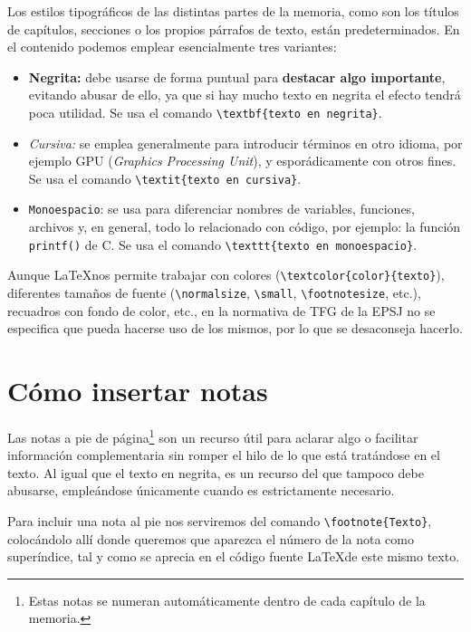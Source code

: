 Los estilos tipográficos de las distintas partes de la memoria, como son los títulos de capítulos, secciones o los propios párrafos de texto, están predeterminados. En el contenido podemos emplear esencialmente tres variantes:

\begin{itemize}
    \item \textbf{Negrita:} debe usarse de forma puntual para \textbf{destacar algo importante}, evitando abusar de ello, ya que si hay mucho texto en negrita el efecto tendrá poca utilidad. Se usa el comando \verb|\textbf{texto en negrita}|.

    \item \textit{Cursiva:} se emplea generalmente para introducir términos en otro idioma, por ejemplo GPU (\textit{Graphics Processing Unit}), y esporádicamente con otros fines. Se usa el comando \verb|\textit{texto en cursiva}|.

    \item \texttt{Monoespacio}: se usa para diferenciar nombres de variables, funciones, archivos y, en general, todo lo relacionado con código, por ejemplo: la función \texttt{printf()} de C. Se usa el comando \verb|\texttt{texto en monoespacio}|.
\end{itemize}

Aunque \LaTeX nos permite trabajar con colores (\verb|\textcolor{color}{texto}|), diferentes tamaños de fuente (\verb|\normalsize|, \verb|\small|, \verb|\footnotesize|, etc.), recuadros con fondo de color, etc., en la normativa de TFG de la EPSJ no se especifica que pueda hacerse uso de los mismos, por lo que se desaconseja hacerlo.

\section{Cómo insertar notas}

Las notas a pie de página\footnote{Estas notas se numeran automáticamente dentro de cada capítulo de la memoria.} son un recurso útil para aclarar algo o facilitar información complementaria sin romper el hilo de lo que está tratándose en el texto. Al igual que el texto en negrita, es un recurso del que tampoco debe abusarse, empleándose únicamente cuando es estrictamente necesario.

Para incluir una nota al pie nos serviremos del comando \verb|\footnote{Texto}|, colocándolo allí donde queremos que aparezca el número de la nota como superíndice, tal y como se aprecia en el código fuente \LaTeX de este mismo texto.

